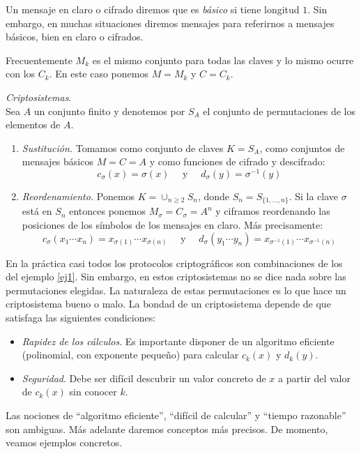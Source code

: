 Un mensaje en claro o cifrado diremos que es {\it básico} si tiene longitud $1$. Sin embargo, en muchas situaciones diremos mensajes para referirnos a mensajes básicos, bien en claro o cifrados. 

Frecuentemente $M_k$ es el mismo conjunto para todas las claves y lo mismo ocurre con los $C_k$. En este caso ponemos $M=M_k$ y $C=C_k$.

\begin{ej}\label{ej1} {\it Criptosistemas}.
    \\
    Sea $A$ un conjunto finito y denotemos por $S_A$ el conjunto de permutaciones de los elementos de $A$.
    \begin{enumerate}[label=(\arabic*)]
        \item {\it Sustitución.} Tomamos como conjunto de claves $K=S_A$, como conjuntos de mensajes básicos $M=C=A$ y como funciones de cifrado y descifrado:
        $$c_\sigma(x)=\sigma(x)\quad\text{ y }\quad d_\sigma(y)=\sigma^{-1}(y)$$
        \item {\it Reordenamiento.} Ponemos $K=\cup_{n\geq 2}S_n$, donde $S_n=S_{\{1,\dots,n\}}$. Si la clave $\sigma$ está en $S_n$ entonces ponemos $M_\sigma=C_\sigma=A^n$ y ciframos reordenando las posiciones de los símbolos de los mensajes en claro. Más precisamente:
        $$c_\sigma(x_1\cdots x_n)=x_{\sigma(1)}\cdots x_{\sigma(n)}\quad\text{ y }\quad d_\sigma(y_1\cdots y_n)=x_{\sigma^{-1}(1)}\cdots x_{\sigma^{-1}(n)}$$
    \end{enumerate}
\end{ej}

En la práctica casi todos los protocolos criptográficos son combinaciones de los del ejemplo \ref{ej1}. Sin embargo, en estos criptosistemas no se dice nada sobre las permutaciones elegidas. La naturaleza de estas permutaciones es lo que hace un criptosistema bueno o malo. La bondad de un criptosistema depende de que satisfaga las siguientes condiciones:

\begin{itemize}[label=$\bullet$]
    \item {\it Rapidez de los cálculos}. Es importante disponer de un algoritmo eficiente (polinomial, con exponente pequeño) para calcular $c_k(x)$ y $d_k(y)$.
    \item {\it Seguridad}. Debe ser difícil descubrir un valor concreto de $x$ a partir del valor de $c_k(x)$ sin conocer $k$.
\end{itemize}

Las nociones de ``algoritmo eficiente'', ``difícil de calcular'' y ``tiempo razonable'' son ambiguas. Más adelante daremos conceptos más precisos. De momento, veamos ejemplos concretos.

